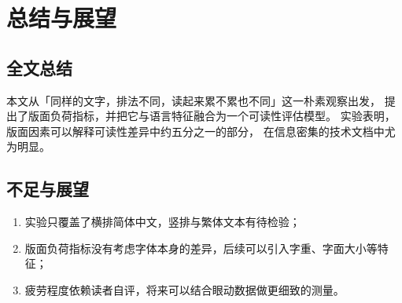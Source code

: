 \chapter{总结与展望}
\label{chap:conclusion}

\section{全文总结}

本文从「同样的文字，排法不同，读起来累不累也不同」这一朴素观察出发，
提出了版面负荷指标，并把它与语言特征融合为一个可读性评估模型。
实验表明，版面因素可以解释可读性差异中约五分之一的部分，
在信息密集的技术文档中尤为明显。

\section{不足与展望}

\begin{enumerate}
  \item 实验只覆盖了横排简体中文，竖排与繁体文本有待检验；
  \item 版面负荷指标没有考虑字体本身的差异，后续可以引入字重、字面大小等特征；
  \item 疲劳程度依赖读者自评，将来可以结合眼动数据做更细致的测量。
\end{enumerate}
